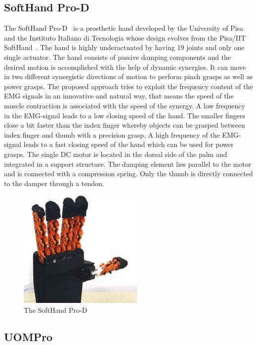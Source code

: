 \documentclass[a4paper, 10pt, conference]{ieeeconf}      %
\begin{document}
\subsection{SoftHand Pro-D}

The SoftHand Pro-D~\cite{softhand} is a prosthetic hand developed by the University of Pisa and the Instituto Italiano di Tecnologia whose design evolves from the Pisa/IIT SoftHand~\cite{pisahand}. The hand is highly underactuated by having 19 joints and only one single actuator. The hand consists of passive damping components and the desired motion is accomplished with the help of dynamic synergies. It can move in two different synergistic directions of motion to perform pinch grasps as well as power grasps. The proposed approach tries to exploit the frequency content of the EMG signals in an innovative and natural way, that means the speed of the muscle contraction is associated with the speed of the synergy. A low frequency in the EMG-signal leads to a low closing speed of the hand. The smaller fingers close a bit faster than the index finger whereby objects can be grasped between index finger and thumb with a precision grasp. A high frequency of the EMG-signal leads to a fast closing speed of the hand which can be used for power grasps. The single DC motor is located in the dorsal side of the palm and integrated in a support structure. The damping element lies parallel to the motor and is connected with a compression spring. Only the thumb is directly connected to the damper through a tendon.

\begin{figure}[h]

	\centering
	\includegraphics[scale=1.0]{images/SoftHand}
	
	\caption{The SoftHand Pro-D}
\end{figure}

\subsection{UOMPro}
\end{document}
